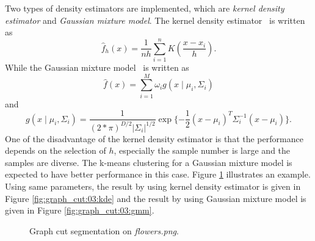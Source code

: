 \documentclass[paper=a4, fontsize=11pt]{scrartcl}
\begin{document}
Two types of density estimators are implemented, which are \emph{kernel density estimator} and \emph{Gaussian mixture model}.
The kernel density estimator~\cite{wiki:Kernel_density_estimation} is written as
\begin{equation}
\label{eq:kde}
\hat{f}_{h}(x) = \frac{1}{nh} \sum_{i=1}^{n} K(\frac{x-x_{i}}{h}).
\end{equation}
While the Gaussian mixture model~\cite{wiki:Mixture_model} is written as
\begin{equation}
\hat{f} (x) = \sum_{i=1}^{M} \omega_{i} g(x \mid \mu_{i} , \Sigma_{i})
\end{equation}
and
\begin{equation}
g(x \mid \mu_{i} , \Sigma_{i}) = \frac{1}{(2 * \pi)^{D/2} | \Sigma_{i} |^{1/2} } \exp \{ - \frac{1}{2} (x - \mu_{i})^{T} \Sigma_{i}^{-1} (x-\mu_{i})  \}.
\end{equation}
One of the disadvantage of the kernel density estimator is that the performance depends on the selection of $ h $, especially the sample number is large and the samples are diverse.
The k-means clustering for a Gaussian mixture model is expected to have better performance in this case.
Figure \ref{fig:graph_cut:03} illustrates an example.
Using same parameters, the result by using kernel density estimator is given in Figure \ref{fig:graph_cut:03:kde} and the result by using Gaussian mixture model is given in Figure \ref{fig:graph_cut:03:gmm}.

\begin{figure}[h]
\centering
{}
\caption{Graph cut segmentation on \emph{flowers.png}.}
\label{fig:graph_cut:03}
\end{figure}
\end{document}
